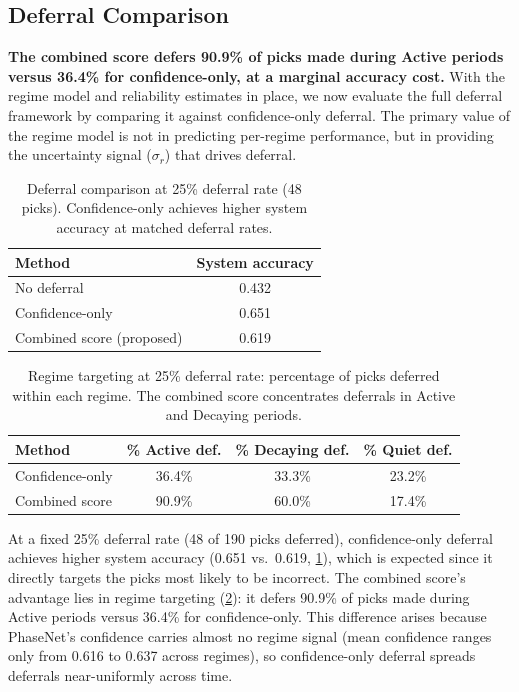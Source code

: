 \subsection{Deferral Comparison}
\label{sec:deferral_comparison}

\textbf{The combined score defers 90.9\% of picks made during Active periods versus 36.4\% for confidence-only, at a marginal accuracy cost.} With the regime model and reliability estimates in place, we now evaluate the full deferral framework by comparing it against confidence-only deferral. The primary value of the regime model is not in predicting per-regime performance, but in providing the uncertainty signal ($\sigma_r$) that drives deferral.

\begin{table}[t]
    \centering
    \caption{Deferral comparison at 25\% deferral rate (48 picks). Confidence-only achieves higher system accuracy at matched deferral rates.}
    \label{tab:deferral}
    \small
    \begin{tabular}{@{}lc@{}}
        \toprule
        Method & System accuracy \\
        \midrule
        No deferral & 0.432 \\
        Confidence-only & 0.651 \\
        Combined score (proposed) & 0.619 \\
        \bottomrule
    \end{tabular}
\end{table}

\begin{table}[t]
    \centering
    \caption{Regime targeting at 25\% deferral rate: percentage of picks deferred within each regime. The combined score concentrates deferrals in Active and Decaying periods.}
    \label{tab:targeting}
    \small
    \begin{tabular}{@{}lccc@{}}
        \toprule
        Method & \% Active def. & \% Decaying def. & \% Quiet def. \\
        \midrule
        Confidence-only & 36.4\% & 33.3\% & 23.2\% \\
        Combined score & 90.9\% & 60.0\% & 17.4\% \\
        \bottomrule
    \end{tabular}
\end{table}

\medskip
At a fixed 25\% deferral rate (48 of 190 picks deferred), confidence-only deferral achieves higher system accuracy (0.651 vs.\ 0.619, \cref{tab:deferral}), which is expected since it directly targets the picks most likely to be incorrect. The combined score's advantage lies in regime targeting (\cref{tab:targeting}): it defers 90.9\% of picks made during Active periods versus 36.4\% for confidence-only. This difference arises because PhaseNet's confidence carries almost no regime signal (mean confidence ranges only from 0.616 to 0.637 across regimes), so confidence-only deferral spreads deferrals near-uniformly across time.


